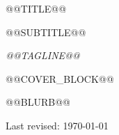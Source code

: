 \begin{titlepage}
  \centering
  \vspace*{@@TOPSPACE@@}
  {\Huge\rmfamily\color{inkdark} @@TITLE@@\par}
  \vspace{0.5cm}
  {\Large\sffamily\color{inkmuted} @@SUBTITLE@@\par}
  \vspace{0.3cm}
  {\normalsize\itshape\color{inkmuted} @@TAGLINE@@\par}
@@COVER_BLOCK@@  \vspace{@@SPACER@@}
  {\normalsize\color{inkbody} @@BLURB@@\par}
  \vfill
  {\small\color{inkdim} Last revised: \today}
\end{titlepage}
